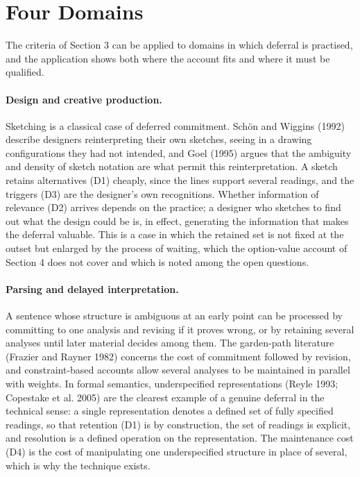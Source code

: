 \documentclass[11pt]{article}
\theoremstyle{remark}
\begin{document}
\section{Four Domains}

The criteria of Section 3 can be applied to domains in which deferral is practised, and the application shows both where the account fits and where it must be qualified.

\paragraph{Design and creative production.} Sketching is a classical case of deferred commitment. Schön and Wiggins (1992) describe designers reinterpreting their own sketches, seeing in a drawing configurations they had not intended, and Goel (1995) argues that the ambiguity and density of sketch notation are what permit this reinterpretation. A sketch retains alternatives (D1) cheaply, since the lines support several readings, and the triggers (D3) are the designer's own recognitions. Whether information of relevance (D2) arrives depends on the practice; a designer who sketches to find out what the design could be is, in effect, generating the information that makes the deferral valuable. This is a case in which the retained set is not fixed at the outset but enlarged by the process of waiting, which the option-value account of Section 4 does not cover and which is noted among the open questions.

\paragraph{Parsing and delayed interpretation.} A sentence whose structure is ambiguous at an early point can be processed by committing to one analysis and revising if it proves wrong, or by retaining several analyses until later material decides among them. The garden-path literature (Frazier and Rayner 1982) concerns the cost of commitment followed by revision, and constraint-based accounts allow several analyses to be maintained in parallel with weights. In formal semantics, underspecified representations (Reyle 1993; Copestake et al. 2005) are the clearest example of a genuine deferral in the technical sense: a single representation denotes a defined set of fully specified readings, so that retention (D1) is by construction, the set of readings is explicit, and resolution is a defined operation on the representation. The maintenance cost (D4) is the cost of manipulating one underspecified structure in place of several, which is why the technique exists.
\end{document}
